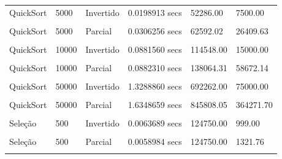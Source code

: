 \documentclass[
]{article}
\begin{document}
\begin{longtable}[l]{llllll}
QuickSort & 5000 & Invertido & 0.0198913 secs & 52286.00 & 7500.00\\
\cellcolor{gray!15}{QuickSort} & \cellcolor{gray!15}{5000} & \cellcolor{gray!15}{Ordenado} & \cellcolor{gray!15}{0.0364048 secs} & \cellcolor{gray!15}{54774.00} & \cellcolor{gray!15}{0.00}\\
QuickSort & 5000 & Parcial & 0.0306256 secs & 62592.02 & 26409.63\\
\cellcolor{gray!15}{QuickSort} & \cellcolor{gray!15}{10000} & \cellcolor{gray!15}{Aleatório} & \cellcolor{gray!15}{0.0971727 secs} & \cellcolor{gray!15}{143824.18} & \cellcolor{gray!15}{92592.51}\\
QuickSort & 10000 & Invertido & 0.0881560 secs & 114548.00 & 15000.00\\
\cellcolor{gray!15}{QuickSort} & \cellcolor{gray!15}{10000} & \cellcolor{gray!15}{Ordenado} & \cellcolor{gray!15}{0.0848975 secs} & \cellcolor{gray!15}{119535.00} & \cellcolor{gray!15}{0.00}\\
QuickSort & 10000 & Parcial & 0.0882310 secs & 138064.31 & 58672.14\\
\cellcolor{gray!15}{QuickSort} & \cellcolor{gray!15}{50000} & \cellcolor{gray!15}{Aleatório} & \cellcolor{gray!15}{1.7015193 secs} & \cellcolor{gray!15}{848051.17} & \cellcolor{gray!15}{543859.65}\\
QuickSort & 50000 & Invertido & 1.3288860 secs & 692262.00 & 75000.00\\
\cellcolor{gray!15}{QuickSort} & \cellcolor{gray!15}{50000} & \cellcolor{gray!15}{Ordenado} & \cellcolor{gray!15}{1.4357085 secs} & \cellcolor{gray!15}{717248.00} & \cellcolor{gray!15}{0.00}\\
QuickSort & 50000 & Parcial & 1.6348659 secs & 845808.05 & 364271.70\\
\cellcolor{gray!15}{Seleção} & \cellcolor{gray!15}{500} & \cellcolor{gray!15}{Aleatório} & \cellcolor{gray!15}{0.0060219 secs} & \cellcolor{gray!15}{124750.00} & \cellcolor{gray!15}{1485.98}\\
Seleção & 500 & Invertido & 0.0063689 secs & 124750.00 & 999.00\\
\cellcolor{gray!15}{Seleção} & \cellcolor{gray!15}{500} & \cellcolor{gray!15}{Ordenado} & \cellcolor{gray!15}{0.0063312 secs} & \cellcolor{gray!15}{124750.00} & \cellcolor{gray!15}{499.00}\\
Seleção & 500 & Parcial & 0.0058984 secs & 124750.00 & 1321.76\\
\cellcolor{gray!15}{Seleção} & \cellcolor{gray!15}{1000} & \cellcolor{gray!15}{Aleatório} & \cellcolor{gray!15}{0.0241992 secs} & \cellcolor{gray!15}{499500.00} & \cellcolor{gray!15}{2984.90}\\

\end{longtable}
\end{document}
